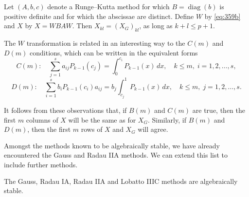 \begin{corollary}

  \label{cor:359B}
Let $(A, b, c)$ denote a Runge--Kutta method for which $B = \operatorname{diag}(b)$ is positive definite and for which the abscissae are distinct. Define $W$ by \eqref{eq:359b} and $X$ by $X = W B A W$. Then $X_{kl} = (X_G)_{kl}$, as long as $k + l \leq p + 1$.

The $W$ transformation is related in an interesting way to the $C(m)$ and $D(m)$ conditions, which can be written in the equivalent forms
\[
C(m): \quad \sum_{j=1}^{s} a_{ij} P_{k-1}(c_j) = \int_{0}^{c_i} P_{k-1}(x) \, dx, \quad k \leq m, \; i = 1, 2, \dots, s,
\]
\[
D(m): \quad \sum_{i=1}^{s} b_i P_{k-1}(c_i) a_{ij} = b_j \int_{c_j}^{1} P_{k-1}(x) \, dx, \quad k \leq m, \; j = 1, 2, \dots, s.
\]

It follows from these observations that, if $B(m)$ and $C(m)$ are true, then the first $m$ columns of $X$ will be the same as for $X_G$. Similarly, if $B(m)$ and $D(m)$, then the first $m$ rows of $X$ and $X_G$ will agree.

Amongst the methods known to be algebraically stable, we have already encountered the Gauss and Radau IIA methods. We can extend this list to include further methods.
\end{corollary}

\begin{theorem}

  \label{thm:359C}
The Gauss, Radau IA, Radau IIA and Lobatto IIIC methods are algebraically stable.
\end{theorem}

